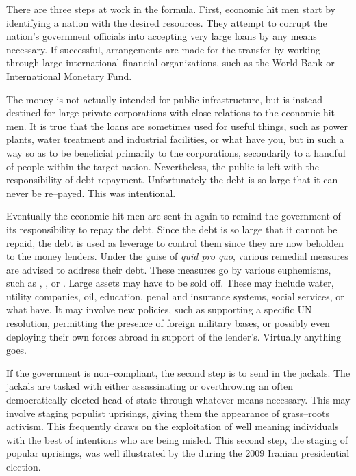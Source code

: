 There are three steps at work in the formula. First, economic hit men start by identifying a nation with the desired resources. They attempt to corrupt the nation's government officials into accepting very large loans by any means necessary. If successful, arrangements are made for the transfer by working through large international financial organizations, such as the World Bank or International Monetary Fund.

The money is not actually intended for public infrastructure, but is instead destined for large private corporations with close relations to the economic hit men. It is true that the loans are sometimes used for useful things, such as power plants, water treatment and industrial facilities, or what have you, but in such a way so as to be beneficial primarily to the corporations, secondarily to a handful of people within the target nation. Nevertheless, the public is left with the responsibility of debt repayment. Unfortunately the debt is so large that it can never be re--payed. This was intentional.

Eventually the economic hit men are sent in again to remind the government of its responsibility to repay the debt. Since the debt is so large that it cannot be repaid, the debt is used as leverage to control them since they are now beholden to the money lenders. Under the guise of {\it quid pro quo}, various remedial measures are advised to address their debt. These measures go by various euphemisms, such as , , or . Large assets may have to be sold off. These may include water, utility companies, oil, education, penal and insurance systems, social services, or what have. It may involve new policies, such as supporting a specific UN resolution, permitting the presence of foreign military bases, or possibly even deploying their own forces abroad in support of the lender's. Virtually anything goes.

If the government is non--compliant, the second step is to send in the jackals. The jackals are tasked with either assassinating or overthrowing an often democratically elected head of state through whatever means necessary. This may involve staging populist uprisings, giving them the appearance of grass--roots activism. This frequently draws on the exploitation of well meaning individuals with the best of intentions who are being misled. This second step, the staging of popular uprisings, was well illustrated by the  during the 2009 Iranian presidential election.\footnotecite[hersh2008]\footnotecite[ross2007]

